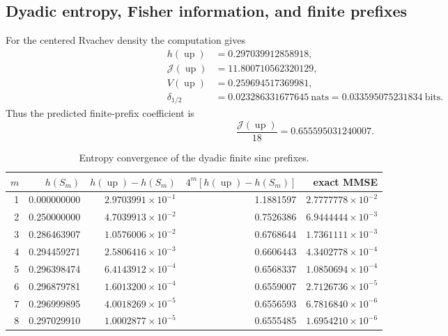\documentclass[11pt,oneside]{article}
\theoremstyle{definition}
\theoremstyle{remark}
\newcommand{\Up}{\operatorname{up}}
\begin{document}
\subsection{Dyadic entropy, Fisher information, and finite prefixes}

For the centered Rvachev density the computation gives
\begin{align}
 h(\Up)&=0.297039912858918,\label{eq:num-hup}\\
 \mathcal J(\Up)&=11.800710562320129,\label{eq:num-Jup}\\
 V(\Up)&=0.259694517369981,\label{eq:num-Vup}\\
 \delta_{1/2}&=0.023286331677645\ \text{nats}
 =0.033595075231834\ \text{bits}.
 \label{eq:num-deficit-up}
\end{align}
Thus the predicted finite-prefix coefficient is
\begin{equation}
 \frac{\mathcal J(\Up)}{18}=0.655595031240007.
 \label{eq:num-prefix-coeff}
\end{equation}

\begin{table}[H]
\centering
\caption{Entropy convergence of the dyadic finite sinc prefixes.}
\label{tab:prefix-entropy}
\small
\begin{tabular}{@{}rrrrr@{}}
\toprule
$m$ & $h(S_m)$ & $h(\Up)-h(S_m)$ & $4^m[h(\Up)-h(S_m)]$ & exact MMSE\\
\midrule
1 & 0.000000000 & $2.9703991\!\times10^{-1}$ & 1.1881597 & $2.7777778\!\times10^{-2}$\\
2 & 0.250000000 & $4.7039913\!\times10^{-2}$ & 0.7526386 & $6.9444444\!\times10^{-3}$\\
3 & 0.286463907 & $1.0576006\!\times10^{-2}$ & 0.6768644 & $1.7361111\!\times10^{-3}$\\
4 & 0.294459271 & $2.5806416\!\times10^{-3}$ & 0.6606443 & $4.3402778\!\times10^{-4}$\\
5 & 0.296398474 & $6.4143912\!\times10^{-4}$ & 0.6568337 & $1.0850694\!\times10^{-4}$\\
6 & 0.296879781 & $1.6013200\!\times10^{-4}$ & 0.6559007 & $2.7126736\!\times10^{-5}$\\
7 & 0.296999895 & $4.0018269\!\times10^{-5}$ & 0.6556593 & $6.7816840\!\times10^{-6}$\\
8 & 0.297029910 & $1.0002877\!\times10^{-5}$ & 0.6555485 & $1.6954210\!\times10^{-6}$\\
\bottomrule
\end{tabular}
\end{table}
\end{document}

